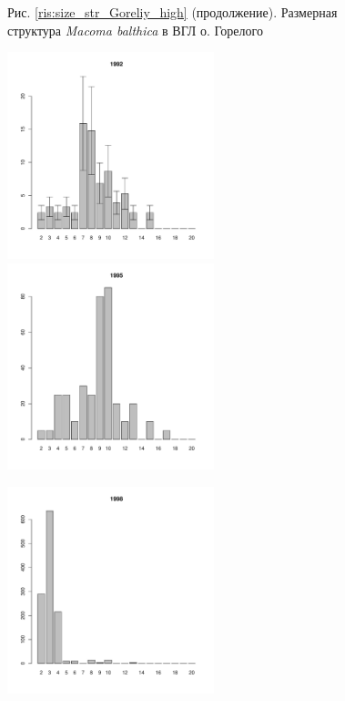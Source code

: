 \documentclass[12pt, a4paper]{article}
\begin{document}
\begin{figure}[h]


\begin{center}
Рис. \ref{ris:size_str_Goreliy_high} (продолжение). Размерная структура {\it Macoma balthica} в ВГЛ о. Горелого

\end{center}
\end{figure}



\newpage \begin{figure}[h] 

\begin{multicols}{3}
\hfill
\includegraphics[width=60mm]{../White_Sea/Luvenga_Goreliy/middle2_1992_.pdf}
\hfill
\includegraphics[width=60mm]{../White_Sea/Luvenga_Goreliy/middle2_1995_.pdf}

\hfill
\includegraphics[width=60mm]{../White_Sea/Luvenga_Goreliy/middle2_1998_.pdf}


\end{multicols}
\end{figure}
\end{document}
